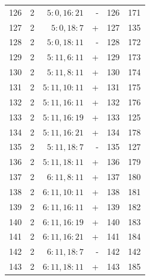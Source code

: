 \begin{center}
\begin{tabular}{rrrrrr}
126 & 2 & $5:0,16:21$ & - & 126 & 171\\
127 & 2 & $5:0,18:7$ & + & 127 & 135\\
128 & 2 & $5:0,18:11$ & - & 128 & 172\\
129 & 2 & $5:11,6:11$ & + & 129 & 173\\
130 & 2 & $5:11,8:11$ & + & 130 & 174\\
131 & 2 & $5:11,10:11$ & + & 131 & 175\\
132 & 2 & $5:11,16:11$ & + & 132 & 176\\
133 & 2 & $5:11,16:19$ & + & 133 & 125\\
134 & 2 & $5:11,16:21$ & + & 134 & 178\\
135 & 2 & $5:11,18:7$ & - & 135 & 127\\
136 & 2 & $5:11,18:11$ & + & 136 & 179\\
137 & 2 & $6:11,8:11$ & + & 137 & 180\\
138 & 2 & $6:11,10:11$ & + & 138 & 181\\
139 & 2 & $6:11,16:11$ & + & 139 & 182\\
140 & 2 & $6:11,16:19$ & + & 140 & 183\\
141 & 2 & $6:11,16:21$ & + & 141 & 184\\
142 & 2 & $6:11,18:7$ & - & 142 & 142\\
143 & 2 & $6:11,18:11$ & + & 143 & 185\\
\bottomrule\end{tabular}\end{center}\clearpage
